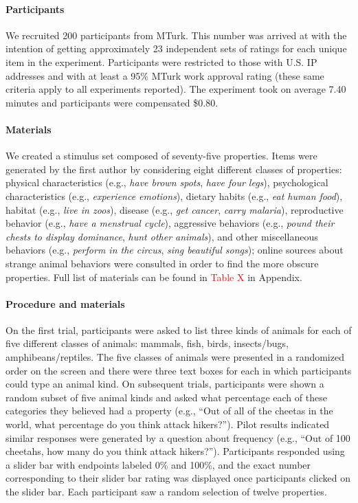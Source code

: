 \documentclass[,man,floatsintext]{apa6}
\let\oldparagraph\paragraph
\renewcommand{\paragraph}[1]{\oldparagraph{#1}\mbox{}}
\theoremstyle{definition}
\theoremstyle{definition}
\theoremstyle{definition}
\theoremstyle{remark}
\begin{document}
\hypertarget{participants-2}{%
\paragraph{Participants}\label{participants-2}}

We recruited 200 participants from MTurk. This number was arrived at
with the intention of getting approximately 23 independent sets of
ratings for each unique item in the experiment. Participants were
restricted to those with U.S. IP addresses and with at least a 95\%
MTurk work approval rating (these same criteria apply to all experiments
reported). The experiment took on average 7.40 minutes and participants
were compensated \$0.80.

\hypertarget{materials}{%
\paragraph{Materials}\label{materials}}

We created a stimulus set composed of seventy-five properties. Items
were generated by the first author by considering eight different
classes of properties: physical characteristics (e.g., \emph{have brown
spots}, \emph{have four legs}), psychological characteristics (e.g.,
\emph{experience emotions}), dietary habits (e.g., \emph{eat human
food}), habitat (e.g., \emph{live in zoos}), disease (e.g., \emph{get
cancer}, \emph{carry malaria}), reproductive behavior (e.g., \emph{have
a menstrual cycle}), aggressive behaviors (e.g., \emph{pound their
chests to display dominance}, \emph{hunt other animals}), and other
miscellaneous behaviors (e.g., \emph{perform in the circus}, \emph{sing
beautiful songs}); online sources about strange animal behaviors were
consulted in order to find the more obscure properties. Full list of
materials can be found in {\textcolor{Red}{Table X}} in Appendix.

\hypertarget{procedure-and-materials-2}{%
\paragraph{Procedure and materials}\label{procedure-and-materials-2}}

On the first trial, participants were asked to list three kinds of
animals for each of five different classes of animals: mammals, fish,
birds, insects/bugs, amphibeans/reptiles. The five classes of animals
were presented in a randomized order on the screen and there were three
text boxes for each in which participants could type an animal kind. On
subsequent trials, participants were shown a random subset of five
animal kinds and asked what percentage each of these categories they
believed had a property (e.g., \enquote{Out of all of the cheetas in the
world, what percentage do you think attack hikers?}). Pilot results
indicated similar responses were generated by a question about frequency
(e.g., \enquote{Out of 100 cheetahs, how many do you think attack
hikers?}). Participants responded using a slider bar with endpoints
labeled 0\% and 100\%, and the exact number corresponding to their
slider bar rating was displayed once participants clicked on the slider
bar. Each participant saw a random selection of twelve properties.
\end{document}
